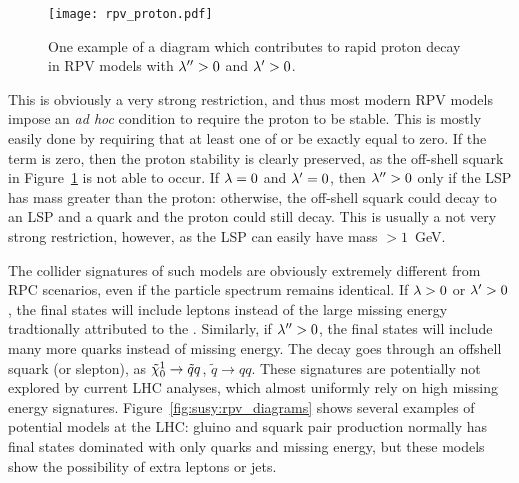 \begin{figure}
\centering
\texttt{[image: rpv\_proton.pdf]}
\label{fig:susy:rpv_proton}
\caption{One example of a diagram which contributes to rapid proton decay in RPV models with $\lambda^{\prime\prime} > 0$ and $\lambda^{\prime} > 0$.}
\end{figure}

This is obviously a very strong restriction, and thus most modern RPV models impose an \textit{ad hoc} condition to require the proton to be stable. This is mostly easily done by requiring that at least one of \lamp or \lampp be exactly equal to zero. If the \lampp term is zero, then the proton stability is clearly preserved, as the off-shell squark in Figure~\ref{fig:susy:rpv_proton} is not able to occur. If $\lambda = 0$ and $\lambda^{\prime} = 0$, then $\lambda^{\prime\prime} > 0$ only if the LSP has mass greater than the proton: otherwise, the off-shell squark could decay to an LSP and a quark and the proton could still decay. This is usually a not very strong restriction, however, as the LSP can easily have mass $> 1$~GeV.

The collider signatures of such models are obviously extremely different from RPC scenarios, even if the particle spectrum remains identical. If $\lambda > 0$ or $\lambda^{\prime} > 0$, the final states will include leptons instead of the large missing energy tradtionally attributed to the \lsp. Similarly, if $\lambda^{\prime\prime} > 0$, the final states will include many more quarks instead of missing energy. The decay goes through an offshell squark (or slepton), as $\tilde{\chi}_0^1 \rightarrow \tilde{q} q$, $\tilde{q}\rightarrow q q$. These signatures are potentially not explored by current LHC analyses, which almost uniformly rely on high missing energy signatures. Figure~\ref{fig:susy:rpv_diagrams} shows several examples of potential models at the LHC: gluino and squark pair production normally has final states dominated with only quarks and missing energy, but these models show the possibility of extra leptons or jets.



